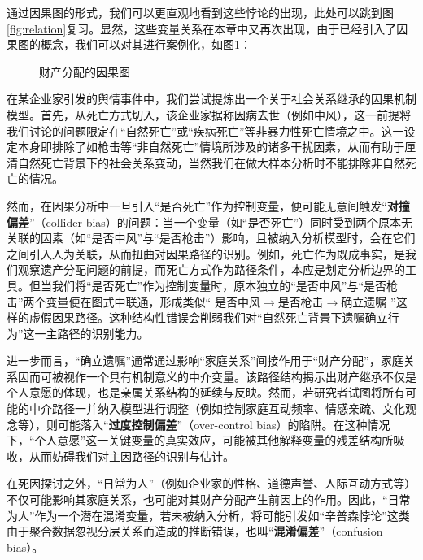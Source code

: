 通过因果图的形式，我们可以更直观地看到这些悖论的出现，此处可以跳到图\ref{fig:relation}复习。显然，这些变量关系在本章中又再次出现，由于已经引入了因果图的概念，我们可以对其进行案例化，如图\ref{fig:wahaha}：

\begin{figure}[ht]
	\centering
	\caption{财产分配的因果图}
	\label{fig:wahaha}
\end{figure}

在某企业家引发的舆情事件中，我们尝试提炼出一个关于社会关系继承的因果机制模型。首先，从死亡方式切入，该企业家据称因病去世（例如中风），这一前提将我们讨论的问题限定在“自然死亡”或“疾病死亡”等非暴力性死亡情境之中。这一设定本身即排除了如枪击等“非自然死亡”情境所涉及的诸多干扰因素，从而有助于厘清自然死亡背景下的社会关系变动，当然我们在做大样本分析时不能排除非自然死亡的情况。

然而，在因果分析中一旦引入“是否死亡”作为控制变量，便可能无意间触发“\textbf{对撞偏差}”（collider bias）的问题：当一个变量（如“是否死亡”）同时受到两个原本无关联的因素（如“是否中风”与“是否枪击”）影响，且被纳入分析模型时，会在它们之间引入人为关联，从而扭曲对因果路径的识别。例如，死亡作为既成事实，是我们观察遗产分配问题的前提，而死亡方式作为路径条件，本应是划定分析边界的工具。但当我们将“是否死亡”作为控制变量时，原本独立的“是否中风”与“是否枪击”两个变量便在图式中联通，形成类似“ $ \text{是否中风} \rightarrow \text{是否枪击} \rightarrow \text{确立遗嘱}$ ”这样的虚假因果路径。这种结构性错误会削弱我们对“自然死亡背景下遗嘱确立行为”这一主路径的识别能力。

进一步而言，“确立遗嘱”通常通过影响“家庭关系”间接作用于“财产分配”，家庭关系因而可被视作一个具有机制意义的中介变量。该路径结构揭示出财产继承不仅是个人意愿的体现，也是亲属关系结构的延续与反映。然而，若研究者试图将所有可能的中介路径一并纳入模型进行调整（例如控制家庭互动频率、情感亲疏、文化观念等），则可能落入“\textbf{过度控制偏差}”（over-control bias）的陷阱。在这种情况下，“个人意愿”这一关键变量的真实效应，可能被其他解释变量的残差结构所吸收，从而妨碍我们对主因路径的识别与估计。

在死因探讨之外，“日常为人”（例如企业家的性格、道德声誉、人际互动方式等）不仅可能影响其家庭关系，也可能对其财产分配产生前因上的作用。因此，“日常为人”作为一个潜在混淆变量，若未被纳入分析，将可能引发如“辛普森悖论”这类由于聚合数据忽视分层关系而造成的推断错误，也叫“\textbf{混淆偏差}”（confusion bias）。

